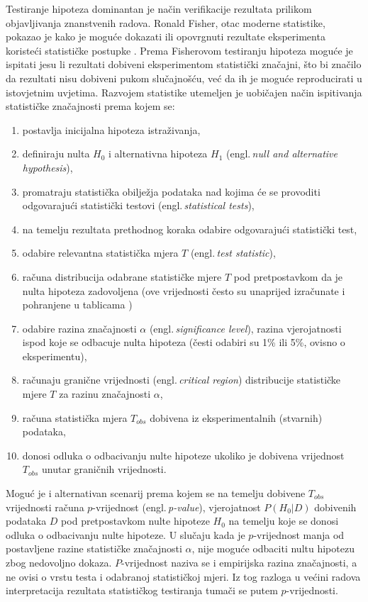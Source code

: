 Testiranje hipoteza dominantan je način verifikacije rezultata prilikom objavljivanja znanstvenih radova. Ronald Fisher, otac moderne statistike, pokazao je kako je moguće dokazati ili opovrgnuti rezultate eksperimenta koristeći statističke postupke \citep{fisher1922mathematical}. Prema Fisherovom testiranju hipoteza moguće je ispitati jesu li rezultati dobiveni eksperimentom statistički značajni, što bi značilo da rezultati nisu dobiveni pukom slučajnošću, već da ih je moguće reproducirati u istovjetnim uvjetima. Razvojem statistike utemeljen je uobičajen način ispitivanja statističke značajnosti prema kojem se:

\begin{enumerate}
\item postavlja inicijalna hipoteza istraživanja,
\item definiraju nulta $H_0$ i alternativna hipoteza $H_1$ (engl.\,\textit{null and alternative hypothesis}),
\item promatraju statistička obilježja podataka nad kojima će se provoditi odgovarajući statistički testovi (engl.\,\textit{statistical tests}),
\item na temelju rezultata prethodnog koraka odabire odgovarajući statistički test,
\item odabire relevantna statistička mjera $T$ (engl.\,\textit{test statistic}),
\item računa distribucija odabrane statističke mjere $T$ pod pretpostavkom da je nulta hipoteza zadovoljena (ove vrijednosti često su unaprijed izračunate i pohranjene u tablicama \citep{wilcoxon1973critical})
\item odabire razina značajnosti $\alpha$ (engl.\,\textit{significance level}), razina vjerojatnosti ispod koje se odbacuje nulta hipoteza (česti odabiri su 1\% ili 5\%, ovisno o eksperimentu),
\item računaju granične vrijednosti (engl.\,\textit{critical region}) distribucije statističke mjere $T$ za razinu značajnosti $\alpha$,
\item računa statistička mjera $T_{obs}$ dobivena iz eksperimentalnih (stvarnih) podataka,
\item donosi odluka o odbacivanju nulte hipoteze ukoliko je dobivena vrijednost $T_{obs}$ unutar graničnih vrijednosti.
\end{enumerate}

Moguć je i alternativan scenarij prema kojem se na temelju dobivene $T_{obs}$ vrijednosti računa $p$-vrijednost (engl.\,\textit{p-value}), vjerojatnost $P(H_0|D)$ dobivenih podataka $D$ pod pretpostavkom nulte hipoteze $H_0$ na temelju koje se donosi odluka o odbacivanju nulte hipoteze. U slučaju kada je $p$-vrijednost manja od postavljene razine statističke značajnosti $\alpha$, nije moguće odbaciti nultu hipotezu zbog nedovoljno dokaza. $P$-vrijednost naziva se i empirijska razina značajnosti, a ne ovisi o vrstu testa i odabranoj statističkoj mjeri. Iz tog razloga u većini radova interpretacija rezultata statističkog testiranja tumači se putem $p$-vrijednosti. 

